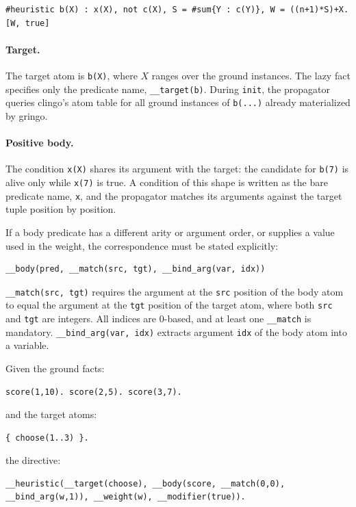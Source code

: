 \begin{verbatim}
#heuristic b(X) : x(X), not c(X), S = #sum{Y : c(Y)}, W = ((n+1)*S)+X. [W, true]
\end{verbatim}

\paragraph{Target.} The target atom is \texttt{b(X)}, where $X$ ranges over the ground instances. The lazy fact specifies only the predicate name, \texttt{\_\_target(b)}. During \texttt{init}, the propagator queries clingo's atom table for all ground instances of \texttt{b(...)} already materialized by gringo.

\paragraph{Positive body.} The condition \texttt{x(X)} shares its argument with the target: the candidate for \texttt{b(7)} is alive only while \texttt{x(7)} is true. A condition of this shape is written as the bare predicate name, \texttt{x}, and the propagator matches its arguments against the target tuple position by position.

If a body predicate has a different arity or argument order, or supplies a value used in the weight, the correspondence must be stated explicitly:

\begin{verbatim}
__body(pred, __match(src, tgt), __bind_arg(var, idx))
\end{verbatim}

\texttt{\_\_match(src, tgt)} requires the argument at the \texttt{src} position of the body atom to equal the argument at the \texttt{tgt} position of the target atom, where both \texttt{src} and \texttt{tgt} are integers. All indices are 0-based, and at least one \texttt{\_\_match} is mandatory. \texttt{\_\_bind\_arg(var, idx)} extracts argument \texttt{idx} of the body atom into a variable.

Given the ground facts:
\begin{verbatim}
score(1,10). score(2,5). score(3,7).
\end{verbatim}
and the target atoms:
\begin{verbatim}
{ choose(1..3) }.
\end{verbatim}
the directive:
\begin{verbatim}
__heuristic(__target(choose), __body(score, __match(0,0), __bind_arg(w,1)), __weight(w), __modifier(true)).
\end{verbatim}

